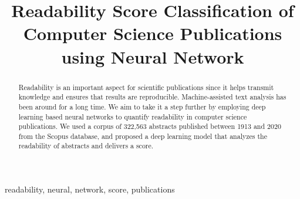 \documentclass[conference]{IEEEtran}
\begin{document}
\title{Readability Score Classification of Computer Science Publications using Neural Network\\
}

\author{
\and
{}
\and
{}
}

\maketitle

\begin{abstract}
Readability is an important aspect for scientific publications since it helps transmit knowledge and ensures that results are reproducible. Machine-assisted text analysis has been around for a long time. We aim to take it a step further by employing deep learning based neural networks to quantify readability in computer science publications. We used a corpus of 322,563 abstracts published between 1913 and 2020 from the Scopus database, and proposed a deep learning model that analyzes the readability of abstracts and delivers a score. 
\end{abstract}

\begin{IEEEkeywords}
readability, neural, network, score, publications
\end{IEEEkeywords}
\end{document}
